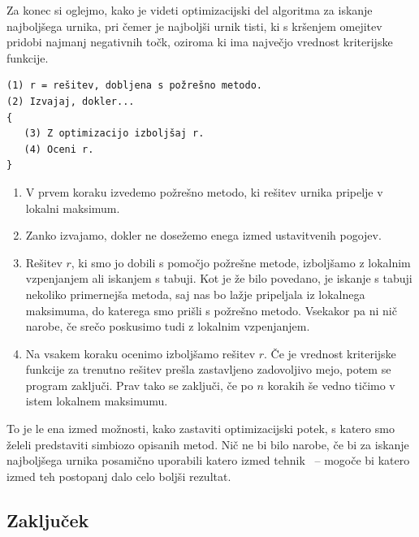 \documentclass[a4paper, 10pt]{article}
\begin{document}
Za konec si oglejmo, kako je videti optimizacijski del algoritma za iskanje najboljšega
urnika, pri čemer je najboljši urnik tisti, ki s kršenjem omejitev pridobi najmanj negativnih
točk, oziroma ki ima največjo vrednost kriterijske funkcije.

\begin{verbatim}
(1) r = rešitev, dobljena s požrešno metodo.
(2) Izvajaj, dokler...
{
   (3) Z optimizacijo izboljšaj r.
   (4) Oceni r.
}
\end{verbatim}
\begin{enumerate}
   

   \item V prvem koraku izvedemo požrešno metodo, ki rešitev urnika pripelje v lokalni maksimum.

   \item Zanko izvajamo, dokler ne dosežemo enega izmed ustavitvenih pogojev.

   \item Rešitev $r$, ki smo jo dobili s pomočjo požrešne metode, izboljšamo z lokalnim vzpenjanjem
   ali iskanjem s tabuji. Kot je že bilo povedano, je iskanje s tabuji nekoliko primernejša metoda,
   saj nas bo lažje pripeljala iz lokalnega maksimuma, do katerega smo prišli s požrešno metodo.
   Vsekakor pa ni nič narobe, če srečo poskusimo tudi z lokalnim vzpenjanjem.

   \item Na vsakem koraku ocenimo izboljšamo rešitev $r$. Če je vrednost kriterijske funkcije
   za trenutno rešitev prešla zastavljeno zadovoljivo mejo, potem se program zaključi. Prav tako
   se zaključi, če po $n$ korakih še vedno tičimo v istem lokalnem maksimumu.

\end{enumerate}

\noindent To je le ena izmed možnosti, kako zastaviti optimizacijski potek, s katero smo želeli predstaviti
simbiozo opisanih metod. Nič ne bi bilo narobe, če bi za iskanje najboljšega urnika posamično
uporabili katero izmed tehnik \ \---  mogoče bi katero izmed teh postopanj dalo celo boljši rezultat.

\subsection{Zaključek }
\end{document}
